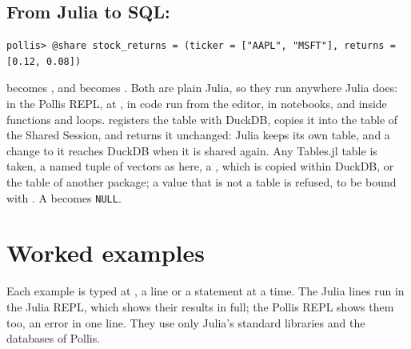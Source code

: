 \subsection{From Julia to SQL: \texorpdfstring{}{@share}}
\begin{lstlisting}
pollis> @share stock_returns = (ticker = ["AAPL", "MSFT"], returns = [0.12, 0.08])
\end{lstlisting}
 becomes , and  becomes
. Both are plain Julia, so they run anywhere Julia does: in the Pollis REPL, at
, in code run from the editor, in notebooks, and inside functions and loops.  registers the
table with DuckDB, copies it into the table  of the Shared Session, and returns it unchanged: Julia keeps
its own table, and a change to it reaches DuckDB when it is shared again. Any Tables.jl table is taken, a named tuple
of vectors as here, a , which is copied within DuckDB, or the table of another package; a value
that is not a table is refused, to be bound with \file{=}. A  becomes \texttt{\small NULL}.

\section{Worked examples}\label{sec:examples}
Each example is typed at , a line or a statement at a time. The Julia lines run in the Julia REPL, which
shows their results in full; the Pollis REPL shows them too, an error in one line. They use only Julia's standard libraries and the
databases of Pollis.

